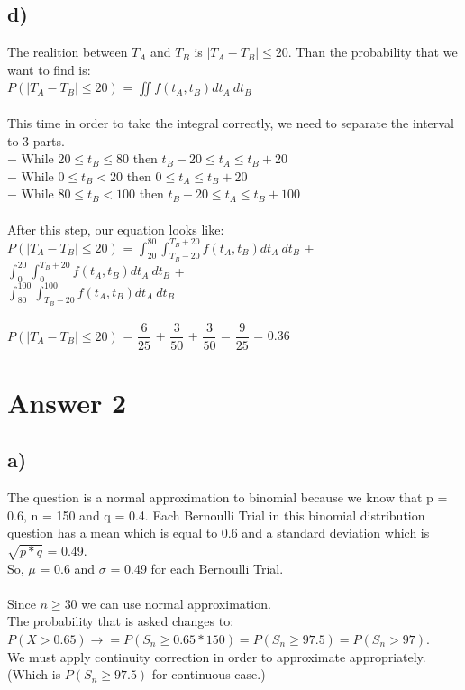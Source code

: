 \documentclass[12pt]{article}
\begin{document}
\subsection*{d)} 
The realition between $T_A$ and $T_B$ is $|T_A - T_B| \leq 20$. Than the probability that we want to find is:\\
$P(|T_A - T_B| \leq 20)$ = $\iint f(t_A , t_B ) dt_A \ dt_B $\\
\\
This time in order to take the integral correctly, we need to separate the interval to 3 parts.\\
$-$ While $20 \leq t_B \leq 80$ then $t_B - 20 \leq t_A \leq t_B + 20$\\
$-$ While $0 \leq t_B < 20$ then $0 \leq t_A \leq t_B + 20$\\
$-$ While $80 \leq t_B < 100$ then $t_B - 20 \leq t_A \leq t_B + 100$\\
\\
After this step, our equation looks like:\\
$P(|T_A - T_B| \leq 20)$ =  $\int_{20}^{80} \int_{T_B - 20}^{T_B + 20} f(t_A , t_B ) dt_A \ dt_B $ +  $\int_{0}^{20} \int_{0}^{T_B + 20} f(t_A , t_B ) dt_A \ dt_B $ + \\  $\int_{80}^{100} \int_{T_B - 20}^{100} f(t_A , t_B ) dt_A \ dt_B $\\
\\
$P(|T_A - T_B| \leq 20)$ = $\dfrac{6}{25}$ + $\dfrac{3}{50}$ + $\dfrac{3}{50}$ = $\dfrac{9}{25}$ = 0.36\\


\section*{Answer 2}

\subsection*{a)} 
The question is a normal approximation to binomial because we know that p = 0.6, n = 150 and q = 0.4.  Each Bernoulli Trial in this binomial distribution question has a mean which is equal to 0.6 and a standard deviation which is $\sqrt{p * q}$ = 0.49.\\
So, $\mu$ = 0.6 and $\sigma$ = 0.49 for each Bernoulli Trial.\\
\\
Since $n \geq 30$ we can use normal approximation.\\
The probability that is asked changes to:\\
 $P(X > 0.65) \rightarrow = P(S_n \geq 0.65*150) = P(S_n \geq 97.5) = P(S_n > 97)$.\\
We must apply continuity correction in order to approximate appropriately. (Which is $P(S_n \geq 97.5)$ for continuous case.)\\
\end{document}
